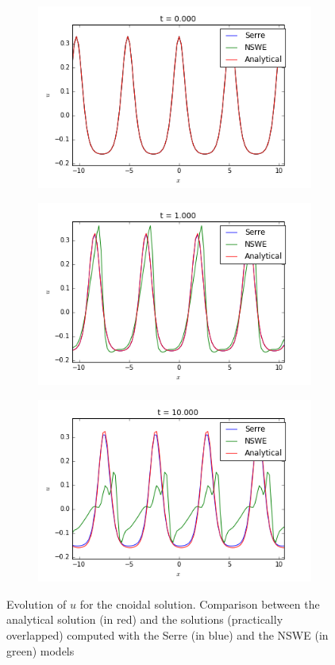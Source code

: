 \begin{figure}[h!]
	\begin{subfigure}{.3\linewidth}
		\includegraphics[scale=.3]{figures/Serre/4x4cnoidal1u.png}	
	\end{subfigure}
	\begin{subfigure}{.3\linewidth}
		\includegraphics[scale=.3]{figures/Serre/4x4cnoidal2u.png}	
	\end{subfigure}
	\begin{subfigure}{.3\linewidth}
		\includegraphics[scale=.3]{figures/Serre/4x4cnoidal3u.png}	
	\end{subfigure}
	\caption{Evolution of $u$ for the cnoidal solution. Comparison between the analytical solution (in red) and the solutions (practically overlapped) computed with the Serre (in blue) and the NSWE (in green)  models \label{fig:cnoidalu}}
\end{figure}

